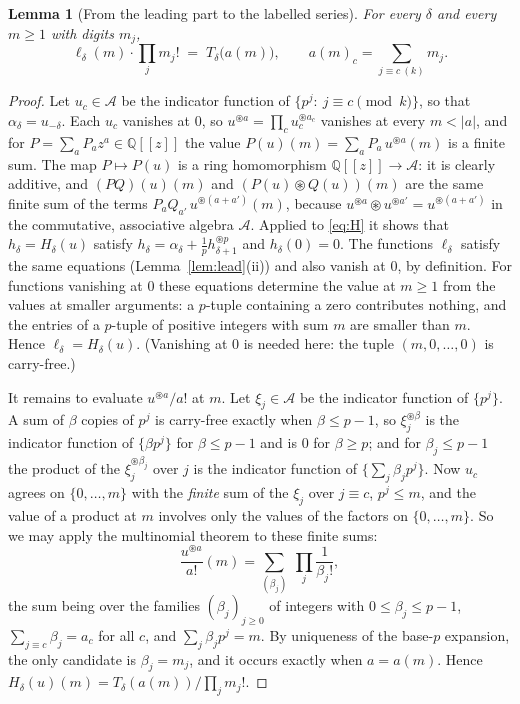 \documentclass[11pt]{article}
\newtheorem{lemma}[theorem]{Lemma}
\theoremstyle{definition}
\theoremstyle{remark}
\newcommand{\Q}{\mathbb Q}
\newcommand{\A}{\mathcal A}
\newcommand{\cf}{\circledast}
\begin{document}
\begin{lemma}[From the leading part to the labelled series]\label{lem:subst}
For every $\delta$ and every $m\ge1$ with digits $m_j$,
\[
 \ell_\delta(m)\cdot\prod_jm_j!\;=\;T_\delta\bigl(a(m)\bigr),\qquad
 a(m)_c=\sum_{j\equiv c\ (k)}m_j .
\]
\end{lemma}

\begin{proof}
Let $u_c\in\A$ be the indicator function of $\{p^j:\ j\equiv c\pmod k\}$, so that
$\alpha_\delta=u_{-\delta}$. Each $u_c$ vanishes at $0$, so $u^{\cf a}=\prod_cu_c^{\cf a_c}$
vanishes at every $m<|a|$, and for $P=\sum_aP_az^a\in\Q[[z]]$ the value
$P(u)(m)=\sum_aP_a\,u^{\cf a}(m)$ is a finite sum. The map $P\mapsto P(u)$ is a ring
homomorphism $\Q[[z]]\to\A$: it is clearly additive, and $(PQ)(u)(m)$ and
$(P(u)\cf Q(u))(m)$ are the same finite sum of the terms
$P_aQ_{a'}\,u^{\cf(a+a')}(m)$, because $u^{\cf a}\cf u^{\cf a'}=u^{\cf(a+a')}$ in the
commutative, associative algebra $\A$. Applied to \eqref{eq:H} it shows that
$h_\delta=H_\delta(u)$ satisfy $h_\delta=\alpha_\delta+\frac1p h_{\delta+1}^{\cf p}$ and
$h_\delta(0)=0$. The functions $\ell_\delta$ satisfy the same equations
(Lemma~\ref{lem:lead}(ii)) and also vanish at $0$, by definition. For functions vanishing at
$0$ these equations determine the value at $m\ge1$ from the values at smaller arguments: a
$p$-tuple containing a zero contributes nothing, and the entries of a $p$-tuple of positive
integers with sum $m$ are smaller than $m$. Hence $\ell_\delta=H_\delta(u)$. (Vanishing at
$0$ is needed here: the tuple $(m,0,\dots,0)$ is carry-free.)

It remains to evaluate $u^{\cf a}/a!$ at $m$. Let $\xi_j\in\A$ be the indicator function of
$\{p^j\}$. A sum of $\beta$ copies of $p^j$ is carry-free exactly when $\beta\le p-1$, so
$\xi_j^{\cf\beta}$ is the indicator function of $\{\beta p^j\}$ for $\beta\le p-1$ and is $0$
for $\beta\ge p$; and for $\beta_j\le p-1$ the product of the $\xi_j^{\cf\beta_j}$ over $j$
is the indicator function of $\{\sum_j\beta_jp^j\}$. Now $u_c$ agrees on $\{0,\dots,m\}$
with the \emph{finite} sum of the $\xi_j$ over $j\equiv c$, $p^j\le m$, and the value of a
product at $m$ involves only the values of the factors on $\{0,\dots,m\}$. So we may apply
the multinomial theorem to these finite sums:
\[
 \frac{u^{\cf a}}{a!}(m)=\sum_{(\beta_j)}\ \prod_j\frac1{\beta_j!},
\]
the sum being over the families $(\beta_j)_{j\ge0}$ of integers with $0\le\beta_j\le p-1$,
$\sum_{j\equiv c}\beta_j=a_c$ for all $c$, and $\sum_j\beta_jp^j=m$. By uniqueness of the
base-$p$ expansion, the only candidate is $\beta_j=m_j$, and it occurs exactly when
$a=a(m)$. Hence $H_\delta(u)(m)=T_\delta(a(m))/\prod_jm_j!$.
\end{proof}
\end{document}
